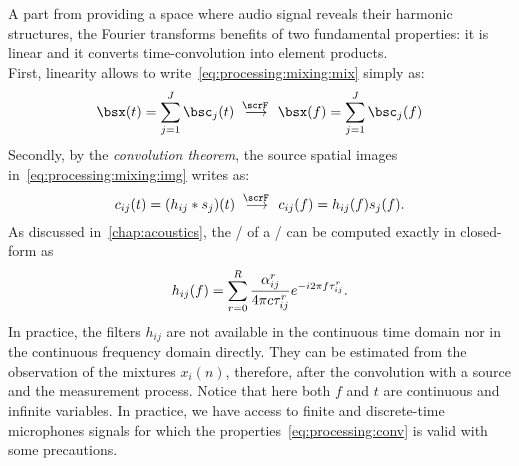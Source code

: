 A part from providing a space where audio signal reveals their harmonic structures, the Fourier transforms benefits of two fundamental properties:
it is linear and it converts time-convolution into element products.
\\First, linearity allows to write~\cref{eq:processing:mixing:mix} simply as:
\begin{equation}\label{eq:processing:ft:mix}
    \mics( t) = \sum_{\idxSrc=1}^{\numSrcs} \imgs_\idxSrc( t)
    \;\overset{\fourierTrans{}}{\kto}\;
    \mics( f) = \sum_{\idxSrc=1}^{\numSrcs} \imgs_\idxSrc( f)
\end{equation}
Secondly, by the \textit{convolution theorem}, the source spatial images in~\cref{eq:processing:mixing:img} writes as:
\begin{equation}\label{eq:processing:conv}
    \img_{\idxMic\idxSrc}( t) =  \kparen{h_{\idxMic\idxSrc} \conv \src_\idxSrc} ( t)
    \;\overset{\fourierTrans{}}{\kto}\;
    \img_{\idxMic\idxSrc}( f) =  h_{\idxMic\idxSrc}( f) \src_\idxSrc( f)
    .
\end{equation}
As discussed in~\cref{chap:acoustics}, the \FT/ of a \RIR/ can be computed exactly in closed-form as
\begin{equation}\label{eq:processing:rir:ft}
    h_{ij}( f) = \sum_{r=0}^{R}
    \frac{\alpha_{ij}^r}{4 \pi c \tau_{ij}^r}
    {e}^{- {i} 2 \pi f \tau_{ij}^r}
    .
\end{equation}
In practice, the filters $h_{ij}$ are not available in the continuous time domain nor in the continuous frequency domain directly.
They can be estimated from the observation of the mixtures $x_i( n)$, therefore,
after the convolution with a source and the measurement process.
Notice that here both $f$ and $t$ are continuous and infinite variables.
In practice, we have access to finite and discrete-time microphones signals for which the properties~\eqref{eq:processing:conv} is valid with some precautions.

